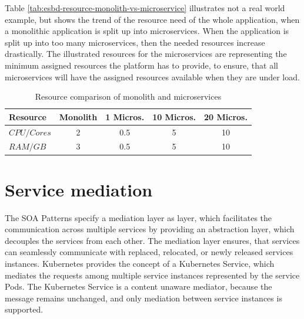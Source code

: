 Table \vref{tab:esbd-resource-monolith-vs-microservice} illustrates not a real world example, but shows the trend of the resource need of the whole application, when a monolithic application is split up into microservices. When the application is split up into too many microservices, then the needed resources increase drastically. The illustrated resources for the microservices are representing the minimum assigned resources the platform has to provide, to ensure, that all microservices will have the assigned resources available when they are under load.

{\renewcommand{\arraystretch}{1.2}%
%
	\begin{table}[h]
		\begin{tabularx}{\textwidth}{ m|c|c|c|c }	
			\textbf{Resource}    & \textbf{Monolith} & \textbf{1 Micros.} & \textbf{10 Micros.} & \textbf{20 Micros.} \\  \hline
			\textit{$CPU/Cores$} & 2                 & 0.5                & 5                   & 10 \\
			\textit{$RAM/GB$}    & 3                 & 0.5                & 5                   & 10 \\ \hline
		\end{tabularx}
		\caption{Resource comparison of monolith and microservices}
		\label{tab:esbd-resource-monolith-vs-microservice}
\end{table}}

\section{Service mediation}
\label{sec:esbd-service-mediation}
The SOA Patterns specify a mediation layer as layer, which facilitates the communication across multiple services by providing an abstraction layer, which decouples the services from each other. The mediation layer ensures, that services can seamlessly communicate with replaced, relocated, or newly released services instances. Kubernetes provides the concept of a Kubernetes Service, which mediates the requests among multiple service instances represented by the service Pods. The Kubernetes Service is a content unaware mediator, because the message remains unchanged, and only mediation between service instances is supported.

